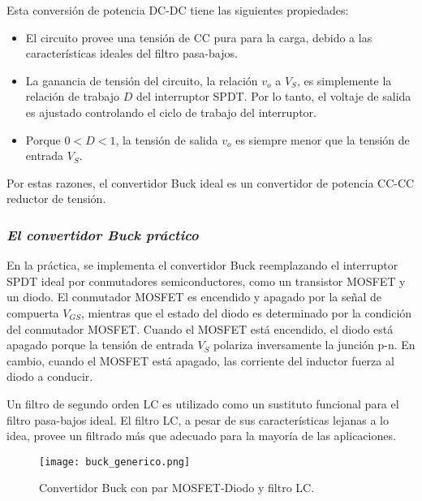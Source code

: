 Esta conversión de potencia DC-DC tiene las siguientes propiedades:
\begin{itemize}[noitemsep]
    \item El circuito provee una tensión de CC pura para la carga, debido a las características ideales del filtro pasa-bajos.
    \item La ganancia de tensión del circuito, la relación $v_o$ a $V_S$, es simplemente la relación de trabajo $D$ del interruptor SPDT. Por lo tanto, el voltaje de salida
    es ajustado controlando el ciclo de trabajo del interruptor.
    \item Porque $0 < D < 1$, la tensión de salida $v_o$ es siempre menor que la tensión de entrada $V_S$.
\end{itemize}

Por estas razones, el convertidor Buck ideal es un convertidor de potencia CC-CC reductor de tensión.

\subsubsection*{\it{El convertidor Buck práctico}}
\vspace{-0.25cm}
En la práctica, se implementa el convertidor Buck reemplazando el interruptor SPDT ideal por conmutadores semiconductores, como un transistor MOSFET y un diodo.
El conmutador MOSFET es encendido y apagado por la señal de compuerta $V_{GS}$, mientras que el estado del diodo es determinado por la condición del conmutador MOSFET.
Cuando el MOSFET está encendido, el diodo está apagado porque la tensión de entrada $V_S$ polariza inversamente la junción p-n. En cambio, cuando el MOSFET está apagado,
las corriente del inductor fuerza al diodo a conducir.

Un filtro de segundo orden LC es utilizado como un sustituto funcional para el filtro pasa-bajos ideal. El filtro LC, a pesar de sus características lejanas a lo idea, provee
un filtrado más que adecuado para la mayoría de las aplicaciones.

\begin{figure}[H]
    \centering
    \texttt{[image: buck\_generico.png]}
    \vspace{-0.25cm}
    \caption{Convertidor Buck con par MOSFET-Diodo y filtro LC.}
    \label{fig:buck_practico}
\end{figure}
\vspace{-0.5cm}
\parencite{CHOI} %